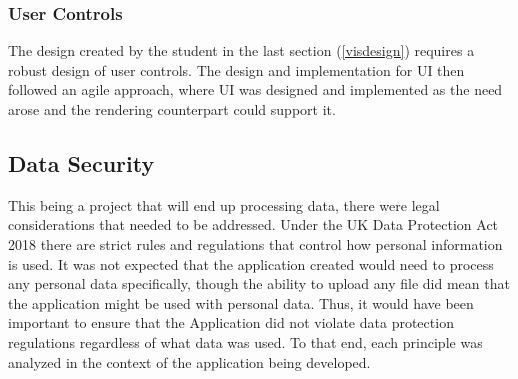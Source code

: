 \subsubsection{User Controls}
The design created by the student in the last section (\ref{visdesign}) requires a robust design of user controls. The design and implementation for UI then followed an agile approach, where UI was designed and implemented as the need arose and the rendering counterpart could support it.

\subsection{Data Security} \label{datasecurity}
This being a project that will end up processing data, there were legal considerations that needed to be addressed. Under the UK Data Protection Act 2018 \cite{govuk_2018_data} there are strict rules and regulations that control how personal information is used. It was not expected that the application created would need to process any personal data specifically, though the ability to upload any file did mean that the application might be used with personal data. Thus, it would have been important to ensure that the Application did not violate data protection regulations regardless of what data was used. To that end, each principle was analyzed in the context of the application being developed.

